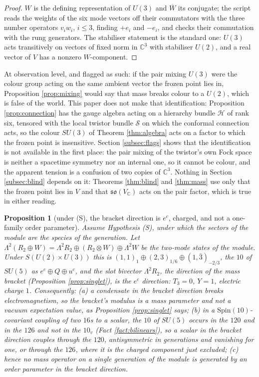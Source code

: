 \documentclass[11pt]{article}
\newtheorem{proposition}[theorem]{Proposition}
\theoremstyle{definition}
\newcommand{\C}{\mathbb{C}}
\newcommand{\so}{\mathfrak{so}}
\begin{document}
\begin{proof}
$W$ is the defining representation of $U(3)$ and $\overline{W}$ its conjugate; the script reads the weights of the six mode vectors off their commutators with the three number operators $v_{i}w_{i}$, $i \le 3$, finding $+e_{i}$ and $-e_{i}$, and checks their commutation with the rung generators. The stabiliser statement is the standard one: $U(3)$ acts transitively on vectors of fixed norm in $\C^{3}$ with stabiliser $U(2)$, and a real vector of $V$ has a nonzero $W$-component.
\end{proof}

At observation level, and flagged as such: if the pair mixing $U(3)$ were the colour group acting on the same ambient vector the frozen point lies in, Proposition \ref{prop:mixing} would say that mass breaks colour to a $U(2)$, which is false of the world. This paper does not make that identification: Proposition \ref{prop:connection} has the gauge algebra acting on a hierarchy bundle $\mathcal{H}$ of rank six, tensored with the local twistor bundle $\mathcal{S}$ on which the conformal connection acts, so the colour $SU(3)$ of Theorem \ref{thm:algebra} acts on a factor to which the frozen point is insensitive. Section \ref{subsec:flags} shows that the identification is not available in the first place: the pair mixing of the twistor's own Fock space is neither a spacetime symmetry nor an internal one, so it cannot be colour, and the apparent tension is a confusion of two copies of $\C^{3}$. Nothing in Section \ref{subsec:blind} depends on it: Theorems \ref{thm:blind} and \ref{thm:mass} use only that the frozen point lies in $V$ and that $\so(V_{\C})$ acts on the pair factor, which is true in either reading.

\begin{proposition}[under (S), the bracket direction is $e^{c}$, charged, and not a one-family order parameter]\label{prop:bracket}
Assume Hypothesis (S), under which the sectors of the module are the species of the generation. Let $\Lambda^{2}(R_{2} \oplus W) = \Lambda^{2}R_{2} \oplus (R_{2} \otimes W) \oplus \Lambda^{2}W$ be the two-mode states of the module. Under $S(U(2) \times U(3))$ this is $(1,1)_{1} \oplus (2,3)_{1/6} \oplus (1,\bar{3})_{-2/3}$, the $10$ of $SU(5)$ as $e^{c} \oplus Q \oplus u^{c}$, and the slot bivector $\Lambda^{2}R_{2}$, the direction of the mass bracket (Proposition \ref{prop:singlet}), is the $e^{c}$ direction: $T_{3} = 0$, $Y = 1$, electric charge $1$. Consequently: (a) a condensate in the bracket direction breaks electromagnetism, so the bracket's modulus is a mass parameter and not a vacuum expectation value, as Proposition \ref{prop:singlet} says; (b) in a $\mathrm{Spin}(10)$-covariant coupling of two $16$s to a scalar, the $10$ of $SU(5)$ occurs in the $120$ and in the $126$ and not in the $10_{v}$ (Fact \ref{fact:bilinears}), so a scalar in the bracket direction couples through the $120$, antisymmetric in generations and vanishing for one, or through the $126$, where it is the charged component just excluded; (c) hence no mass operator on a single generation of the module is generated by an order parameter in the bracket direction.
\end{proposition}
\end{document}

